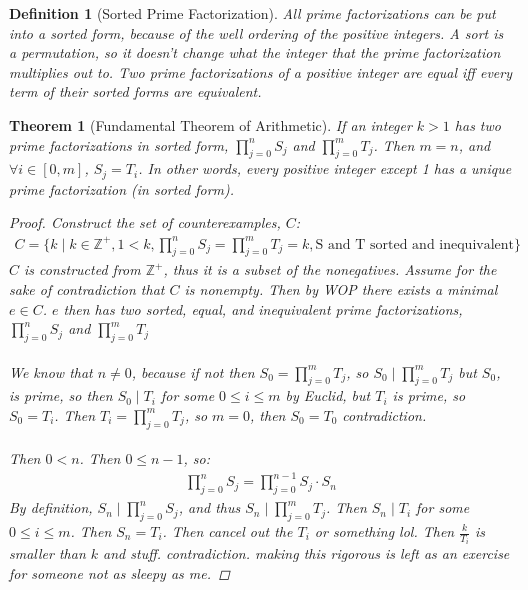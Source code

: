 \documentclass{article}
\newcommand{\ZZ}{\mathbb{Z}}
\newtheorem{thm}{Theorem}
\newtheorem*{defun}{Definition}
\begin{document}
 \begin{defun} [Sorted Prime Factorization] All prime factorizations can be put into a sorted form, because of the well ordering of the positive integers. A sort is a permutation, so it doesn't change what the integer that the prime factorization multiplies out to. Two prime factorizations of a positive integer are equal iff every term of their sorted forms are equivalent.  
 \end{defun}
 \begin{thm} [Fundamental Theorem of Arithmetic] If an integer $k > 1$ has two prime factorizations in sorted form, $\prod_{j=0}^nS_j$ and $\prod_{j=0}^mT_j$. Then $m = n$, and $\forall i \in [0, m]$, $S_j = T_i$. In other words, every positive integer except 1 has a unique prime factorization (in sorted form).
    \begin{proof}
      Construct the set of counterexamples, $C$:
      \begin{align*}
        C = \{k \mid k \in \ZZ^+, 1 < k,  \prod_{j=0}^nS_j = \prod_{j=0}^mT_j = k, \text{S and T sorted and inequivalent} \}
      \end{align*}
      $C$ is constructed from $\ZZ^+$, thus it is a subset of the nonegatives. Assume for the sake of contradiction that $C$ is nonempty. Then by WOP there exists a minimal $e \in C$. $e$ then has two sorted, equal, and inequivalent prime factorizations, $\prod_{j=0}^nS_j$ and $\prod_{j=0}^mT_j$\\\\
      We know that $n \neq 0$, because if not then $S_0 = \prod_{j=0}^mT_j$, so $S_0 \mid \prod_{j=0}^mT_j$ but $S_0$, is prime, so then $S_0 \mid T_i$ for some $0 \le i \le m$ by Euclid, but $T_i$ is prime, so $S_0 = T_i$. Then $T_i =  \prod_{j=0}^mT_j$, so $m = 0$, then $S_0 = T_0$ contradiction.\\\\ 
      Then $0 < n$. Then $0 \le n-1$, so:
      \begin{align*}
        \prod_{j=0}^nS_j = \prod_{j=0}^{n-1}S_j \cdot S_n
      \end{align*}
      By definition, $S_n \mid \prod_{j=0}^nS_j$, and thus $S_n \mid \prod_{j=0}^mT_j$. Then $S_n \mid T_i$ for some $0 \le i \le m$. Then $S_n = T_i$. Then cancel out the $T_i$ or something lol. Then $\frac{k}{T_i}$ is smaller than $k$ and stuff. contradiction. making this rigorous is left as an exercise for someone not as sleepy as me.
    \end{proof}
  \end{thm}
\end{document}

